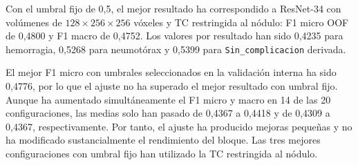 

Con el umbral fijo de 0,5, el mejor resultado ha correspondido a ResNet-34 con volúmenes de $128 \times 256 \times 256$ vóxeles y TC restringida al nódulo: F1 micro OOF de 0,4800 y F1 macro de 0,4752. Los valores por resultado han sido 0,4235 para hemorragia, 0,5268 para neumotórax y 0,5399 para \texttt{Sin\_complicacion} derivada.

El mejor F1 micro con umbrales seleccionados en la validación interna ha sido 0,4776, por lo que el ajuste no ha superado el mejor resultado con umbral fijo. Aunque ha aumentado simultáneamente el F1 micro y macro en 14 de las 20 configuraciones, las medias solo han pasado de 0,4367 a 0,4418 y de 0,4309 a 0,4367, respectivamente. Por tanto, el ajuste ha producido mejoras pequeñas y no ha modificado sustancialmente el rendimiento del bloque. Las tres mejores configuraciones con umbral fijo han utilizado la TC restringida al nódulo.






